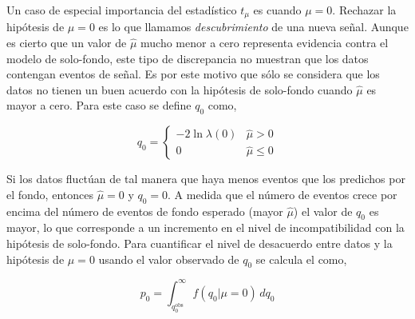 

Un caso de especial importancia del estadístico $t_\mu$ es cuando $\mu=0$.
Rechazar la hipótesis de $\mu=0$ es lo
que llamamos \emph{descubrimiento} de una nueva señal.
Aunque es cierto que un valor de $\hat{\mu}$ mucho menor a cero representa
evidencia contra el modelo de solo-fondo, este tipo de discrepancia no muestran
que los datos contengan eventos de señal. Es por este motivo que sólo se
considera que los datos no tienen un buen acuerdo con la hipótesis de solo-fondo
cuando $\hat{\mu}$ es mayor a cero.
Para este caso se define $q_0$ como,

\begin{equation}
  q_0 =
  \begin{cases}
    -2 \ln \lambda(0) & \hat{\mu} > 0 \\
    0 & \hat{\mu} \leq 0
  \end{cases}
\end{equation}

Si los datos fluctúan de tal manera que haya menos eventos que los predichos por
el fondo, entonces $\hat{\mu} = 0$ y $q_0=0$. A medida que el número de
eventos crece por encima del número de eventos de fondo esperado (mayor
$\hat{\mu}$) el valor de $q_0$ es mayor, lo que corresponde a un incremento en
el nivel de incompatibilidad con la hipótesis de solo-fondo. Para cuantificar el
nivel de desacuerdo entre datos y la hipótesis de $\mu=0$ usando el valor
observado de $q_0$ se calcula el {\pvalue} como,

\begin{equation}
  p_0 = \int_{q_{0}^{\text{obs}}}^{\infty} f(q_0|\mu=0) \, dq_0
  \label{eq:p0}
\end{equation}

